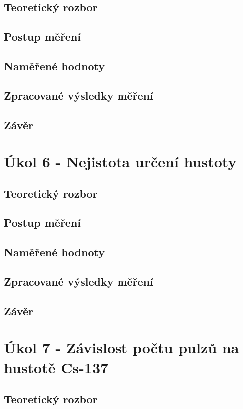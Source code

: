 \documentclass{protokol}
\begin{document}
    \subsection{Teoretický rozbor}
    \subsection{Postup měření}
    \subsection{Naměřené hodnoty}   
    \subsection{Zpracované výsledky měření}
    \subsection{Závěr}

\pagebreak

\section{Úkol 6 - Nejistota určení hustoty}
    \subsection{Teoretický rozbor}
    \subsection{Postup měření}
    \subsection{Naměřené hodnoty}   
    \subsection{Zpracované výsledky měření}
    \subsection{Závěr}

\pagebreak

\section{Úkol 7 - Závislost počtu pulzů na hustotě Cs-137}
    \subsection{Teoretický rozbor}
\end{document}
